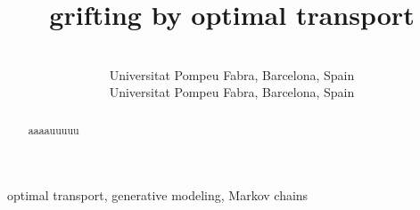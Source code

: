 \documentclass[twoside,10pt]{jmlr}
\title{grifting by optimal transport}
\author{
 \Name[{Gergely~Neu}]{Gergely Neu} \Email{gergely.neu@gmail.com}\\
 \addr Universitat Pompeu Fabra, Barcelona, Spain
 \AND
 \Name{{Lorenzo Croissant}} \Email{lorenzo.croissant@upf.edu}\\
 \addr Universitat Pompeu Fabra, Barcelona, Spain
 }
\begin{document}
\maketitle

\begin{abstract}
aaaauuuuu
\end{abstract}

\begin{keywords}%
  optimal transport, generative modeling, Markov chains
\end{keywords}




\end{document}
